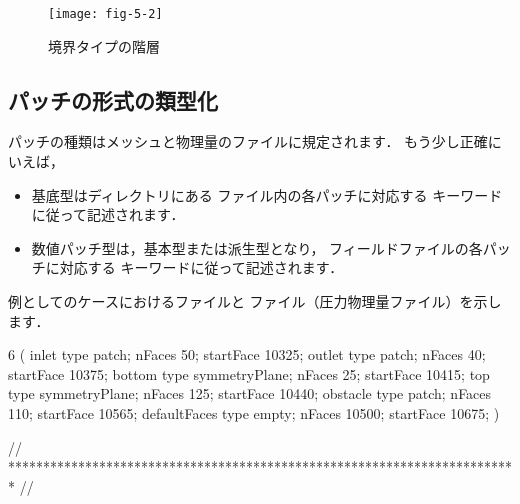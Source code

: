 \begin{figure}[ht]
 \texttt{[image: fig-5-2]}
 \caption{境界タイプの階層}
 \label{fig:5.2}
\end{figure}


\subsection{パッチの形式の類型化}
\label{ssec:5.2.1}
パッチの種類はメッシュと物理量のファイルに規定されます．
もう少し正確にいえば，
\begin{itemize}
 \item 基底型はディレクトリにある
       ファイル内の各パッチに対応する
%
%
       キーワードに従って記述されます．
 \item 数値パッチ型は，基本型または派生型となり，
       フィールドファイルの各パッチに対応する
%
%
       キーワードに従って記述されます．
\end{itemize}
例としてのケースにおけるファイルと
ファイル（圧力物理量ファイル）を示します．
\begin{OFverbatim}[file, linenum=17]

6
(
    inlet
    {
        type            patch;
        nFaces          50;
        startFace       10325;
    }
    outlet
    {
        type            patch;
        nFaces          40;
        startFace       10375;
    }
    bottom
    {
        type            symmetryPlane;
        nFaces          25;
        startFace       10415;
    }
    top
    {
        type            symmetryPlane;
        nFaces          125;
        startFace       10440;
    }
    obstacle
    {
        type            patch;
        nFaces          110;
        startFace       10565;
    }
    defaultFaces
    {
        type            empty;
        nFaces          10500;
        startFace       10675;
    }
)

// ************************************************************************* //
\end{OFverbatim}
